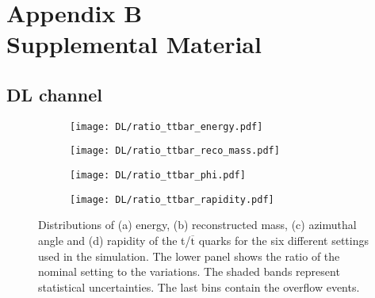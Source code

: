 \cleardoublepage%
%
\chapter[Appendix B - Supplemental Material]{\label{chap:apx_B}Appendix B\\
Supplemental Material}%
\section{\label{app:DL}DL channel}
\newpage
\begin{figure}[H]
    \centering
    \begin{subfigure}{0.49\textwidth}
        \centering
        \texttt{[image: DL/ratio\_ttbar\_energy.pdf]}
        \caption{}
        \label{app:subfig:E(t,tbar)_DL}
    \end{subfigure}
    \begin{subfigure}{0.48\textwidth}
        \centering
        \texttt{[image: DL/ratio\_ttbar\_reco\_mass.pdf]}
        \caption{}
        \label{app:subfig:m(t,tbar)_DL}
    \end{subfigure}

    \vspace{0.2cm}
    
    \begin{subfigure}{0.49\textwidth}
        \centering
        \texttt{[image: DL/ratio\_ttbar\_phi.pdf]}
        \caption{}
        \label{app:subfig:phi(t,tbar)_DL}
    \end{subfigure}
    \begin{subfigure}{0.49\textwidth}
        \centering
        \texttt{[image: DL/ratio\_ttbar\_rapidity.pdf]}
        \caption{}
        \label{app:subfig:y(t,tbar)_DL}
    \end{subfigure}
    
    \caption{Distributions of (a) energy, (b) reconstructed mass, (c) azimuthal angle and (d) rapidity of the t/$\overline{\text{t}}$ quarks for the six different settings used in the simulation. The lower panel shows the ratio of the nominal setting to the variations. The shaded bands represent statistical uncertainties. The last bins contain the overflow events.}
    \label{app:fig:t,tbar_DL}
\end{figure}


